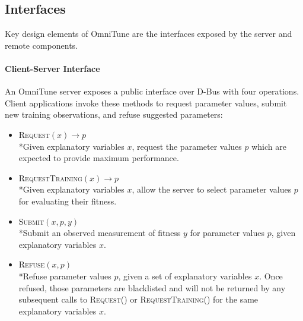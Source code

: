\documentclass[nonatbib,preprint,9pt]{sigplanconf}
\begin{document}
\subsection{Interfaces}

Key design elements of OmniTune are the interfaces exposed by the
server and remote components.

\paragraph{Client-Server Interface} An OmniTune server exposes a
public interface over D-Bus with four operations. Client applications
invoke these methods to request parameter values, submit new training
observations, and refuse suggested parameters:
%
\begin{itemize}
\item \textsc{Request}$(x) \to p$\\*Given explanatory variables $x$,
  request the parameter values $p$ which are expected to provide
  maximum performance.
\item \textsc{RequestTraining}$(x) \to p$\\*Given explanatory
  variables $x$, allow the server to select parameter values $p$ for
  evaluating their fitness.
\item \textsc{Submit}$(x, p, y)$\\*Submit an observed measurement of
  fitness $y$ for parameter values $p$, given explanatory variables
  $x$.
\item \textsc{Refuse}$(x, p)$\\*Refuse parameter values $p$, given a
  set of explanatory variables $x$. Once refused, those parameters are
  blacklisted and will not be returned by any subsequent calls to
  \textsc{Request()} or \textsc{RequestTraining()} for the same
  explanatory variables $x$.
\end{itemize}
%
\end{document}
